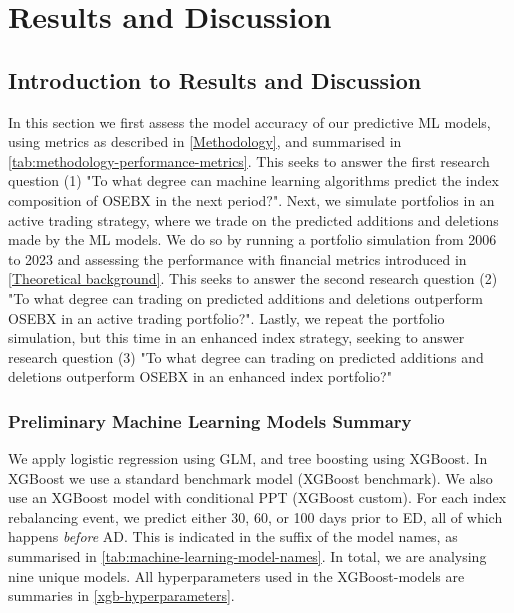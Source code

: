 \section{Results and Discussion}
\label{Results and discussion}

\subsection{Introduction to Results and Discussion}

In this section we first assess the model accuracy of our predictive ML models, using metrics as described in \autoref{Methodology}, and summarised in \autoref{tab:methodology-performance-metrics}. This seeks to answer the first research question (1) "To what degree can machine learning algorithms predict the index composition of OSEBX in the next period?". Next, we simulate portfolios in an active trading strategy, where we trade on the predicted additions and deletions made by the ML models. We do so by running a portfolio simulation from 2006 to 2023 and assessing the performance with financial metrics introduced in \autoref{Theoretical background}. This seeks to answer the second research question (2) "To what degree can trading on predicted additions and deletions outperform OSEBX in an active trading portfolio?". Lastly, we repeat the portfolio simulation, but this time in an enhanced index strategy, seeking to answer research question (3) "To what degree can trading on predicted additions and deletions outperform OSEBX in an enhanced index portfolio?"

\subsubsection{Preliminary Machine Learning Models Summary}

We apply logistic regression using GLM, and tree boosting using XGBoost. In XGBoost we use a standard benchmark model (XGBoost benchmark). We also use an XGBoost model with conditional PPT (XGBoost custom). For each index rebalancing event, we predict either 30, 60, or 100 days prior to ED, all of which happens \textit{before} AD. This is indicated in the suffix of the model names, as summarised in \autoref{tab:machine-learning-model-names}. In total, we are analysing nine unique models. All hyperparameters used in the XGBoost-models are summaries in \autoref{xgb-hyperparameters}. 




